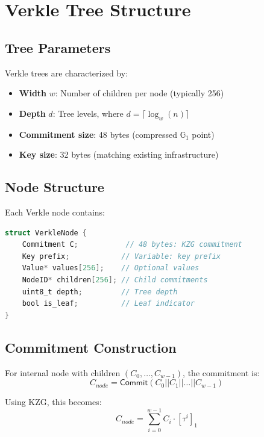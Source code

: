 \section{Verkle Tree Structure}


\subsection{Tree Parameters}

Verkle trees are characterized by:
\begin{itemize}
    \item \textbf{Width} $w$: Number of children per node (typically 256)
    \item \textbf{Depth} $d$: Tree levels, where $d = \lceil \log_w(n) \rceil$
    \item \textbf{Commitment size}: 48 bytes (compressed $\mathbb{G}_1$ point)
    \item \textbf{Key size}: 32 bytes (matching existing infrastructure)
\end{itemize}

\subsection{Node Structure}

Each Verkle node contains:

\begin{lstlisting}[language=C,caption=Verkle Node Structure]
struct VerkleNode {
    Commitment C;           // 48 bytes: KZG commitment
    Key prefix;            // Variable: key prefix
    Value* values[256];    // Optional values
    NodeID* children[256]; // Child commitments
    uint8_t depth;         // Tree depth
    bool is_leaf;          // Leaf indicator
}
\end{lstlisting}

\subsection{Commitment Construction}

For internal node with children $(C_0, \ldots, C_{w-1})$, the commitment is:
\begin{equation}
    C_{node} = \mathsf{Commit}(C_0 || C_1 || \ldots || C_{w-1})
\end{equation}

Using KZG, this becomes:
\begin{equation}
    C_{node} = \sum_{i=0}^{w-1} C_i \cdot [\tau^i]_1
\end{equation}


